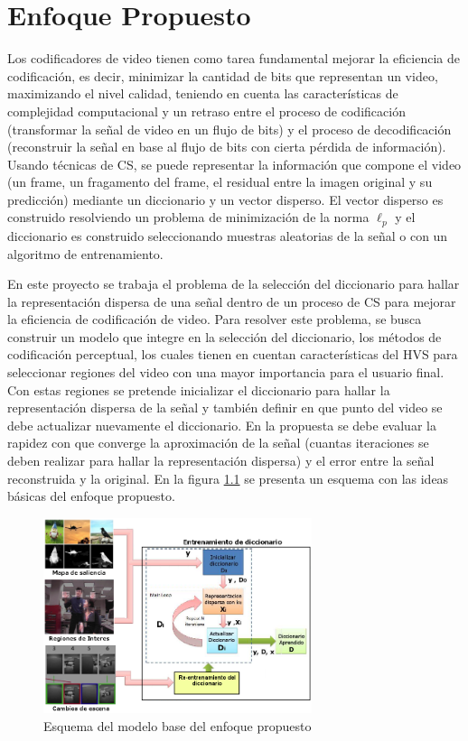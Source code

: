 \chapter{Enfoque Propuesto}
\label{chap:proposed}

Los codificadores de video tienen como tarea fundamental mejorar la eficiencia de codificaci\'on, es decir, minimizar la cantidad de bits que representan un video, maximizando el nivel calidad, teniendo en cuenta las caracter\'isticas de complejidad computacional y un retraso entre el proceso de codificaci\'on (transformar la se\~nal de video en un flujo de bits) y el proceso de decodificaci\'on (reconstruir la se\~nal en base al flujo de bits con cierta p\'erdida de informaci\'on). Usando  t\'ecnicas de CS, se puede representar la informaci\'on que compone el video (un frame, un fragamento del frame, el residual entre la imagen original y su predicci\'on) mediante un diccionario y un vector disperso. El vector disperso es construido resolviendo un problema de minimizaci\'on de la norma $\ell_p$ y el diccionario es construido seleccionando muestras aleatorias de la se\~nal o con un algoritmo de entrenamiento.

En este proyecto se trabaja el problema de la selecci\'on del diccionario para hallar la representaci\'on dispersa de una se\~nal dentro de un proceso de CS para mejorar la eficiencia de codificaci\'on de video. Para resolver este problema, se busca construir un modelo que integre en la selecci\'on del diccionario, los m\'etodos de codificaci\'on perceptual, los cuales tienen en cuentan caracter\'isticas del HVS para seleccionar regiones del video con una mayor importancia para el usuario final. Con estas regiones se pretende inicializar el diccionario para hallar la representaci\'on dispersa de la se\~nal y tambi\'en definir en que punto del video se debe actualizar nuevamente el diccionario. En la propuesta se debe evaluar la rapidez con que converge la aproximaci\'on de la se\~nal (cuantas iteraciones se deben realizar para hallar la representaci\'on dispersa) y el error entre la se\~nal reconstruida y la original. En la figura \ref{fig:proposed_sparse} se presenta un esquema con las ideas b\'asicas del enfoque propuesto.

\begin{figure}[!ht]
\centering
\includegraphics[width=0.7\textwidth]{images/propuesta.png}
\caption{Esquema del modelo base del enfoque propuesto }
\label{fig:proposed_sparse}
\end{figure}

